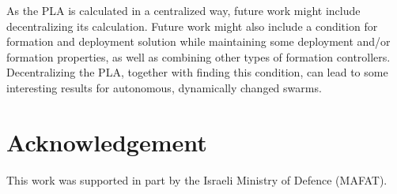 \documentclass{iacas}
\begin{document}
As the PLA is calculated in a centralized way, future work might include decentralizing its calculation. Future work might also include a condition for formation and deployment solution while maintaining some deployment and/or formation properties, as well as combining other types of formation controllers. Decentralizing the PLA, together with finding this condition, can lead to some interesting results for autonomous, dynamically changed swarms.

\section*{Acknowledgement}
This work was supported in part by the Israeli Ministry of Defence (MAFAT).



\end{document}
